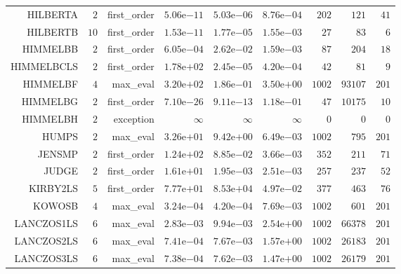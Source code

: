 \begin{longtable}{rrrrrrrrr}
HILBERTA & \(     2\) & first\_order & \( 5.06\)e\(-11\) & \( 5.03\)e\(-06\) & \( 8.76\)e\(-04\) & \(   202\) & \(   121\) & \(    41\) \\
HILBERTB & \(    10\) & first\_order & \( 1.53\)e\(-11\) & \( 1.77\)e\(-05\) & \( 1.55\)e\(-03\) & \(    27\) & \(    83\) & \(     6\) \\
HIMMELBB & \(     2\) & first\_order & \( 6.05\)e\(-04\) & \( 2.62\)e\(-02\) & \( 1.59\)e\(-03\) & \(    87\) & \(   204\) & \(    18\) \\
HIMMELBCLS & \(     2\) & first\_order & \( 1.78\)e\(+02\) & \( 2.45\)e\(-05\) & \( 4.20\)e\(-04\) & \(    42\) & \(    81\) & \(     9\) \\
HIMMELBF & \(     4\) & max\_eval & \( 3.20\)e\(+02\) & \( 1.86\)e\(-01\) & \( 3.50\)e\(+00\) & \(  1002\) & \( 93107\) & \(   201\) \\
HIMMELBG & \(     2\) & first\_order & \( 7.10\)e\(-26\) & \( 9.11\)e\(-13\) & \( 1.18\)e\(-01\) & \(    47\) & \( 10175\) & \(    10\) \\
HIMMELBH & \(     2\) & exception & \(\infty\) & \(\infty\) & \(\infty\) & \(     0\) & \(     0\) & \(     0\) \\
HUMPS & \(     2\) & max\_eval & \( 3.26\)e\(+01\) & \( 9.42\)e\(+00\) & \( 6.49\)e\(-03\) & \(  1002\) & \(   795\) & \(   201\) \\
JENSMP & \(     2\) & first\_order & \( 1.24\)e\(+02\) & \( 8.85\)e\(-02\) & \( 3.66\)e\(-03\) & \(   352\) & \(   211\) & \(    71\) \\
JUDGE & \(     2\) & first\_order & \( 1.61\)e\(+01\) & \( 1.95\)e\(-03\) & \( 2.51\)e\(-03\) & \(   257\) & \(   237\) & \(    52\) \\
KIRBY2LS & \(     5\) & first\_order & \( 7.77\)e\(+01\) & \( 8.53\)e\(+04\) & \( 4.97\)e\(-02\) & \(   377\) & \(   463\) & \(    76\) \\
KOWOSB & \(     4\) & max\_eval & \( 3.24\)e\(-04\) & \( 4.20\)e\(-04\) & \( 7.69\)e\(-03\) & \(  1002\) & \(   601\) & \(   201\) \\
LANCZOS1LS & \(     6\) & max\_eval & \( 2.83\)e\(-03\) & \( 9.94\)e\(-03\) & \( 2.54\)e\(+00\) & \(  1002\) & \( 66378\) & \(   201\) \\
LANCZOS2LS & \(     6\) & max\_eval & \( 7.41\)e\(-04\) & \( 7.67\)e\(-03\) & \( 1.57\)e\(+00\) & \(  1002\) & \( 26183\) & \(   201\) \\
LANCZOS3LS & \(     6\) & max\_eval & \( 7.38\)e\(-04\) & \( 7.62\)e\(-03\) & \( 1.47\)e\(+00\) & \(  1002\) & \( 26179\) & \(   201\) \\

\end{longtable}
